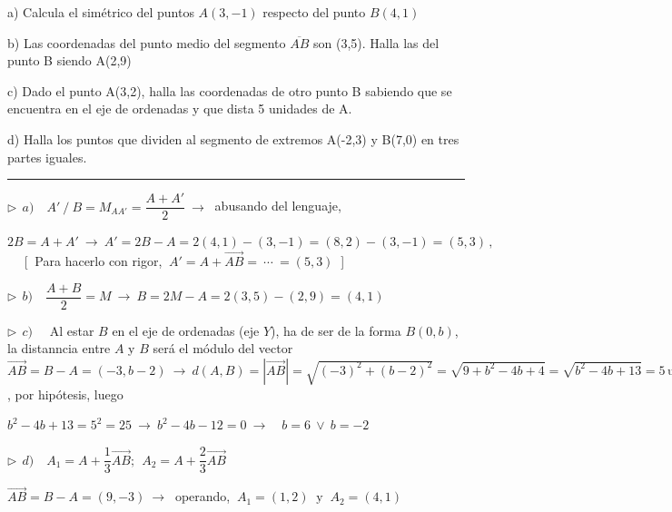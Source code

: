 \begin{miejercicio}

a) Calcula el simétrico del puntos $A(3,-1)$ respecto del punto $B(4,1)$

\vspace{1mm} b) Las coordenadas del punto medio del segmento $\overline{AB}$ son (3,5). Halla las del punto B siendo A(2,9)

\vspace{1mm} c) Dado el punto A(3,2), halla las coordenadas de otro punto B sabiendo que se encuentra en el eje de ordenadas y que dista 5 unidades de A.

\vspace{1mm} d) Halla los puntos que dividen al segmento de extremos  A(-2,3)   y   B(7,0)  en tres partes iguales.

\rule{250pt}{0.5pt}

\vspace{2mm} $\triangleright \ \ a)\quad A' \ / \ B=M_{AA'}=\dfrac{A+A'}{2} \ \to \ $  abusando del lenguaje,

\vspace{2mm} $ 2B=A+A' \ \to \ A'=2B-A=2(4,1)-(3,-1)=(8,2)-(3,-1)=(5,3)\, , $
$\quad$ \textcolor{gris}{[$\ $ Para hacerlo con rigor, $\ A' = A+\overrightarrow{AB} = \ \cdots  \ = (5,3) \ $ ]}

\vspace{4mm} $\triangleright \ \ b)\quad \dfrac{A+B}{2}=M \ \to \ B=2M-A=2(3,5)-(2,9)=(4,1)$

\vspace{4mm} $\triangleright \ \ c)\quad $ Al estar $B$ en el eje de ordenadas (eje $Y$), ha de ser de la forma $B(0,b)$, la distanncia entre $A$ y $B$ será el módulo del vector $\overrightarrow{AB}=B-A=(-3,b-2) \ \to \ d(A,B)=|\overrightarrow{AB}|=\sqrt{(-3)^2+(b-2)^2}=\sqrt{9+b^2-4b+4}=\sqrt{b^2-4b+13}=5\, \mathrm{u}$, por hipótesis, luego

\vspace{2mm} $b^2-4b+13=5^2=25 \ \to \ b^2-4b-12=0 \ \to \quad b=6 \ \vee \ b=-2$

\vspace{4mm} $\triangleright \ \ d)\quad A_1=A+\dfrac{1}{3}\overrightarrow{AB};\ \ A_2=A+\dfrac{2}{3}\overrightarrow{AB}$

\vspace{2mm} $\overrightarrow{AB}=B-A=(9,-3) \ \to \ $ operando, $\  A_1=(1,2) \ \text{ y } \ A_2=(4,1)$
	
\end{miejercicio}



